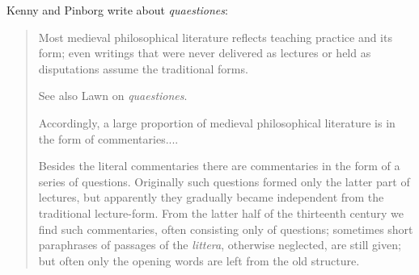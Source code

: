 \documentclass{amsart}
\theoremstyle{definition}
\begin{document}
 Kenny and Pinborg \cite[pp.~29--30]{kenny} write about {\em quaestiones}:
 \begin{quote}
 Most medieval philosophical literature reflects teaching practice and its form; even writings that were never delivered as lectures
 or held as disputations assume the traditional forms.
 
 See also Lawn \cite{lawn} on {\em quaestiones}.
 
 Accordingly, a large proportion of medieval philosophical literature is in the form of commentaries....

  Besides the literal commentaries there are commentaries in the form of a series of questions. Originally
 such questions formed only the latter part of lectures, but apparently they gradually became independent from the traditional
 lecture-form. From the latter half of the thirteenth century we find such commentaries, often consisting
 only of questions; sometimes short paraphrases of passages of the {\em littera}, otherwise neglected, are still
 given; but often only the opening words are left from the old structure.
 \end{quote}
 
\end{document}
